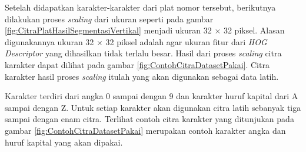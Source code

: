 \begin{adjustbox}{width=1\textwidth}
	\noindent
	\begin{minipage}{\linewidth}
		\label{fig:CitraPlatHasilSegmentasiHorizontal}
	\end{minipage}
\end{adjustbox}

\begin{adjustbox}{width=1\textwidth}
	\noindent\begin{minipage}{\linewidth}
		\label{fig:CitraPlatHasilSegmentasiVertikal}
	\end{minipage}
\end{adjustbox}

\noindent Setelah didapatkan karakter-karakter dari plat nomor tersebut, berikutnya dilakukan proses \textit{scaling} dari ukuran seperti pada gambar \ref{fig:CitraPlatHasilSegmentasiVertikal} menjadi ukuran 32 $\times$ 32 piksel. Alasan digunakannya ukuran 32 $\times$ 32 piksel adalah agar ukuran fitur dari \textit{HOG Descriptor} yang dihasilkan tidak terlalu besar. Hasil dari proses \textit{scaling} citra karakter dapat dilihat pada gambar \ref{fig:ContohCitraDatasetPakai}. Citra karakter hasil proses \textit{scaling} itulah yang akan digunakan sebagai data latih.

\noindent Karakter terdiri dari angka 0 sampai dengan 9 dan karakter huruf kapital dari A sampai dengan Z. Untuk setiap karakter akan digunakan citra latih sebanyak tiga sampai dengan enam citra. Terlihat contoh citra karakter yang ditunjukan pada gambar \ref{fig:ContohCitraDatasetPakai} merupakan contoh karakter angka dan huruf kapital yang akan dipakai.

